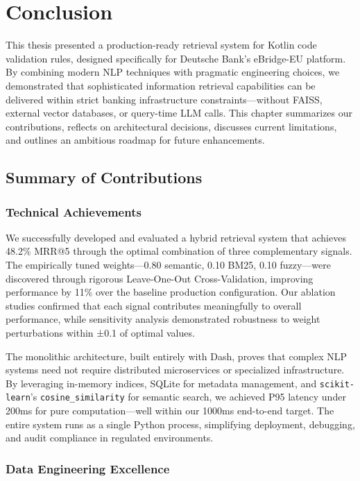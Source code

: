 \chapter{Conclusion}
\label{ch:conclusion}

This thesis presented a production-ready retrieval system for Kotlin code validation rules, designed specifically for Deutsche Bank's eBridge-EU platform. By combining modern NLP techniques with pragmatic engineering choices, we demonstrated that sophisticated information retrieval capabilities can be delivered within strict banking infrastructure constraints—without FAISS, external vector databases, or query-time LLM calls. This chapter summarizes our contributions, reflects on architectural decisions, discusses current limitations, and outlines an ambitious roadmap for future enhancements.

\section{Summary of Contributions}

\subsection{Technical Achievements}

We successfully developed and evaluated a hybrid retrieval system that achieves 48.2\% MRR@5 through the optimal combination of three complementary signals. The empirically tuned weights—0.80 semantic, 0.10 BM25, 0.10 fuzzy—were discovered through rigorous Leave-One-Out Cross-Validation, improving performance by 11\% over the baseline production configuration. Our ablation studies confirmed that each signal contributes meaningfully to overall performance, while sensitivity analysis demonstrated robustness to weight perturbations within ±0.1 of optimal values.

The monolithic architecture, built entirely with Dash, proves that complex NLP systems need not require distributed microservices or specialized infrastructure. By leveraging in-memory indices, SQLite for metadata management, and \texttt{scikit-learn}'s \texttt{cosine\_similarity} for semantic search, we achieved P95 latency under 200ms for pure computation—well within our 1000ms end-to-end target. The entire system runs as a single Python process, simplifying deployment, debugging, and audit compliance in regulated environments.

\subsection{Data Engineering Excellence}


